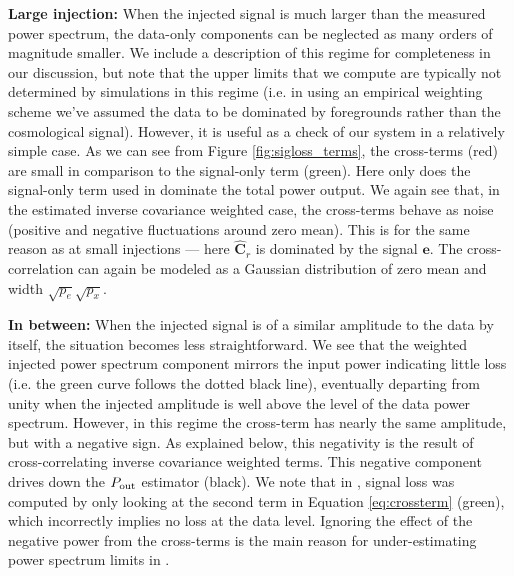 \documentclass[preprint2,numberedappendix,tighten]{aastex6}  %
\begin{document}
{\bf Large injection:}
When the injected signal is much larger than the measured power spectrum, the data-only components can 
be neglected as many orders of magnitude smaller. We include a description of this regime for completeness in our discussion, but note that the upper limits that we compute are typically not determined by simulations in this regime (i.e. in using an empirical weighting scheme we've assumed the data to be dominated by foregrounds rather than the cosmological signal).  However, it is useful as a check of our system in a relatively simple case. As we can see from Figure \ref{fig:sigloss_terms}, the cross-terms (red) are small in comparison to the signal-only term (green). Here only does the signal-only term used in   dominate the total power output. We again see that, in the estimated inverse covariance weighted case, the cross-terms behave as noise (positive and negative fluctuations around zero mean). This is for the same reason as at small injections --- here $\widehat{\textbf{C}}_{r}$ is dominated by the signal $\textbf{e}$. The cross-correlation can again be modeled as a Gaussian distribution of zero mean and width $\sqrt{p_e}\sqrt{p_x}$.

{\bf In between:}
When the injected signal is of a similar amplitude to the data by itself, the situation becomes less straightforward. We see that 
the weighted injected power spectrum component mirrors the input power indicating little loss (i.e. the green curve follows the dotted black line), eventually 
departing from unity when the injected amplitude is well above the level of the data power spectrum. However, 
in this regime the cross-term has nearly the same amplitude, but with a negative sign. As explained below, this negativity is the result of cross-correlating inverse covariance weighted terms.  This negative component drives down the $P_{\rm out}$ estimator (black). We note that in , signal loss was computed by only looking at the second term in Equation \eqref{eq:crossterm} (green), which incorrectly implies no loss at the data level. Ignoring the effect of the negative power from the cross-terms is the main reason for under-estimating power spectrum limits in .
\end{document}
